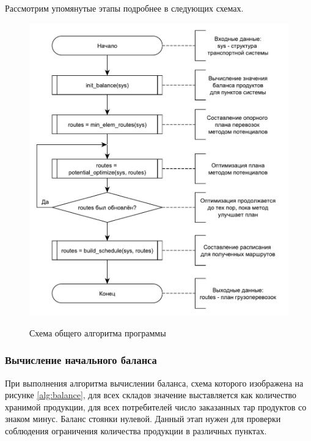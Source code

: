 Рассмотрим упомянутые этапы подробнее в следующих схемах.

\pagebreak
\begin{figure}[h]
	\begin{center}
		{\includegraphics[scale=0.7, angle=0, page=1]{img/main_algorithm.pdf}}
		\caption{Схема общего алгоритма программы}
		\label{alg:main}
	\end{center}
\end{figure}

\subsubsection{Вычисление начального баланса}
При выполнения алгоритма вычислении баланса, схема которого изображена на рисунке \ref{alg:balance}, для всех складов значение выставляется как количество хранимой продукции, для всех потребителей число заказанных тар продуктов со знаком минус. Баланс стоянки нулевой. Данный этап нужен для проверки соблюдения ограничения количества продукции в различных пунктах. 

